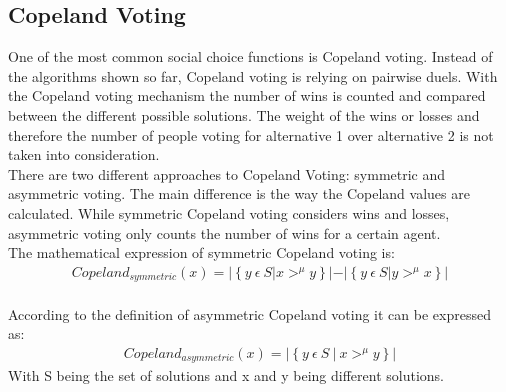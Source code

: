 \documentclass[german, a4paper, 11pt, oneside]{scrbook}
\begin{document}
\subsection{Copeland Voting}
One of the most common social choice functions is Copeland voting.  Instead of the algorithms shown so far, Copeland voting is relying on pairwise duels. With the Copeland voting mechanism the number of wins is counted and compared between the different possible solutions. The weight of the wins or losses and therefore the number of people voting for alternative 1 over alternative 2 is not taken into consideration. \cite{Ek,Brandt}  \\There are two different approaches to Copeland Voting: symmetric and asymmetric voting. The main difference is the way the Copeland values are calculated. While symmetric Copeland voting considers wins and losses, asymmetric voting only counts the number of wins for a certain agent.
\\The mathematical expression of symmetric Copeland voting is: 
\begin{align}
\mathit{Copeland_{symmetric}}(x) = \left| \left\{ y\ \epsilon \ S \left| x>^\mu y \right\} \left| - \right| \left\{ y\ \epsilon \ S  \right| y>^\mu x   \right\} \right|
\end{align} \cite{Brandt}
\\According to the definition of asymmetric Copeland voting it can be expressed as:
\begin{align}
\mathit{Copeland_{asymmetric}}(x) = \left| \left\{ y \ \epsilon \ S \ | \ x>^\mu y \right\}  \right|
\end{align}\cite{Brandt}
With S being the set of solutions and x and y being different solutions.
\end{document}
